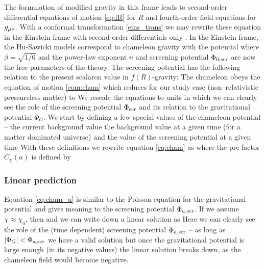 The formulation of modified gravity in this frame leads to second-order differential equations of motion \eqref{eq:fR} for $R$ and fourth-order field equations for $g_{\mu\nu}$. With a conformal transformation \eqref{eins_trans} we may rewrite these equation in the Einstein frame with second-order differentials only \parencite[see, e.g.,][]{CHIBA20031}. In the Einstein frame, the Hu-Sawicki models correspond to chameleon gravity with the potential
where $\beta=\sqrt{1/6}$ and the power-law exponent $n$ and screening potential $\Phi_{0,\text{\scriptsize scr}}$ are now the free parameters of the theory. The screening potential has the following relation to the present scalaron value in $f(R)$-gravity:
The chameleon obeys the equation of motion \eqref{eom:cham} which reduces for our study case (non--relativistic pressureless matter) to
We rescale the equations to units in which we can clearly see the role of the screening potential $\Phi_{\text{\scriptsize scr}}$ and its relation to the gravitational potential $\Phi_G$. We start by defining a few special values of the chameleon potential -- the current background value
the background value at a given time (for a matter dominated universe)
and the value of the screening potential at a given time
With these definitions we rewrite equation \eqref{eq:cham} as
where the pre-factor $C_\chi(a)$ is defined by
\subsubsection{Linear prediction}
Equation \eqref{eq:cham_u} is similar to the Poisson equation for the gravitational potential and gives meaning to the screening potential $\Phi_{a,\text{\scriptsize scr}}$. If we assume $\chi\approx\chi_a$, then
and we can write down a linear solution as
Here we can clearly see the role of the (time dependent) screening potential $\Phi_{a,\text{\scriptsize scr}}$ -- as long as $|\Phi_G| < \Phi_{a,\text{\scriptsize scr}}$ we have a valid solution but once the gravitational potential is large enough (in its negative values) the linear solution breaks down, as the chameleon field would become negative.

